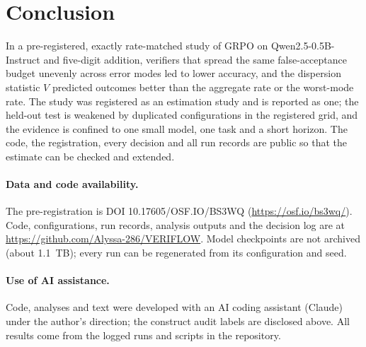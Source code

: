 \section{Conclusion}\label{sec:conclusion}
In a pre-registered, exactly rate-matched study of GRPO on Qwen2.5-0.5B-Instruct and five-digit addition, verifiers that spread the same false-acceptance budget unevenly across error modes led to lower accuracy, and the dispersion statistic $V$ predicted outcomes better than the aggregate rate or the worst-mode rate. The study was registered as an estimation study and is reported as one; the held-out test is weakened by duplicated configurations in the registered grid, and the evidence is confined to one small model, one task and a short horizon. The code, the registration, every decision and all run records are public so that the estimate can be checked and extended.

\paragraph{Data and code availability.} The pre-registration is DOI 10.17605/OSF.IO/BS3WQ (\url{https://osf.io/bs3wq/}). Code, configurations, run records, analysis outputs and the decision log are at \url{https://github.com/Alyssa-286/VERIFLOW}. Model checkpoints are not archived (about 1.1~TB); every run can be regenerated from its configuration and seed.

\paragraph{Use of AI assistance.} Code, analyses and text were developed with an AI coding assistant (Claude) under the author's direction; the construct audit labels are disclosed above. All results come from the logged runs and scripts in the repository.
